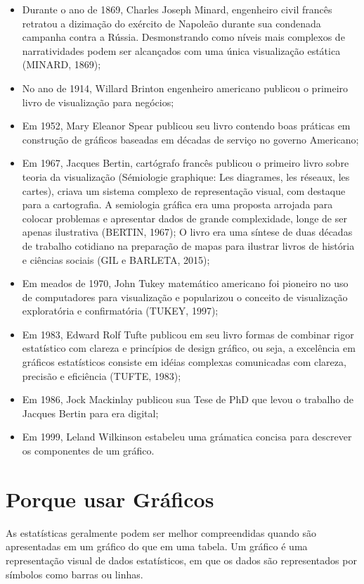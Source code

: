 \begin{itemize}
\item Durante o ano de 1869, Charles Joseph Minard, engenheiro civil francês retratou a dizimação do exército de Napoleão durante sua condenada campanha contra a Rússia. Desmonstrando como níveis mais complexos de narratividades podem ser alcançados com uma única visualização estática (MINARD, 1869);
\item No ano de 1914, Willard Brinton engenheiro americano publicou o primeiro livro de visualização para negócios;
\item Em 1952, Mary Eleanor Spear publicou seu livro contendo boas práticas em construção de gráficos baseadas em décadas de serviço no governo Americano;
\item Em 1967, Jacques Bertin, cartógrafo francês publicou o primeiro livro sobre teoria da visualização (Sémiologie graphique: Les diagrames, les
réseaux, les cartes), criava um sistema complexo de representação visual, com destaque para a cartografia. A semiologia gráfica era uma proposta arrojada para colocar problemas e apresentar dados de grande complexidade, longe de ser apenas ilustrativa (BERTIN, 1967); O livro era uma síntese de duas décadas de trabalho cotidiano na preparação de mapas para ilustrar livros de história e ciências sociais (GIL e BARLETA, 2015);
\item Em meados de 1970, John Tukey matemático americano foi pioneiro no uso de computadores para visualização e popularizou o conceito de visualização exploratória e confirmatória (TUKEY, 1997);
\item Em 1983, Edward Rolf Tufte publicou em seu livro formas de combinar rigor estatístico com clareza e princípios de design gráfico, ou seja, a excelência em gráficos estatísticos consiste em idéias complexas comunicadas com clareza, precisão e eficiência (TUFTE, 1983);
\item Em 1986, Jock Mackinlay publicou sua Tese de PhD que levou o trabalho de Jacques Bertin para era digital;
\item Em 1999, Leland Wilkinson estabeleu uma grámatica concisa para descrever os componentes de um gráfico.
\end{itemize}



\section{Porque usar Gráficos}

As estatísticas geralmente podem ser melhor compreendidas quando são apresentadas em um gráfico do que em uma tabela. Um gráfico é uma representação visual de dados estatísticos, em que os dados são representados por símbolos como barras ou linhas.
\vskip0.3cm  

